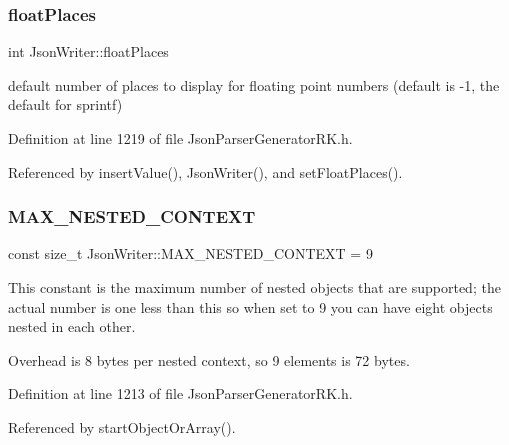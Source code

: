 \mbox{\label{class_json_writer_ab0c979f74ad01b6e9970ffed5b39cb29}} 
\subsubsection{\texorpdfstring{float\+Places}{floatPlaces}}
{\footnotesize\ttfamily int Json\+Writer\+::float\+Places\hspace{0.3cm}{\ttfamily [protected]}}



default number of places to display for floating point numbers (default is -\/1, the default for sprintf) 



Definition at line 1219 of file Json\+Parser\+Generator\+R\+K.\+h.



Referenced by insert\+Value(), Json\+Writer(), and set\+Float\+Places().

\mbox{\label{class_json_writer_a7d1daa126e962c611373f65d1e83e4ee}} 
\subsubsection{\texorpdfstring{M\+A\+X\+\_\+\+N\+E\+S\+T\+E\+D\+\_\+\+C\+O\+N\+T\+E\+XT}{MAX\_NESTED\_CONTEXT}}
{\footnotesize\ttfamily const size\+\_\+t Json\+Writer\+::\+M\+A\+X\+\_\+\+N\+E\+S\+T\+E\+D\+\_\+\+C\+O\+N\+T\+E\+XT = 9\hspace{0.3cm}{\ttfamily [static]}}

This constant is the maximum number of nested objects that are supported; the actual number is one less than this so when set to 9 you can have eight objects nested in each other.

Overhead is 8 bytes per nested context, so 9 elements is 72 bytes. 

Definition at line 1213 of file Json\+Parser\+Generator\+R\+K.\+h.



Referenced by start\+Object\+Or\+Array().

